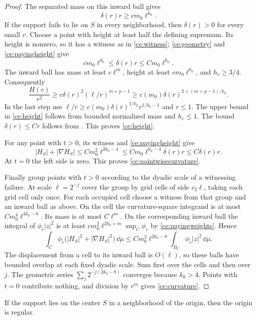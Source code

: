 \begin{proof}


The separated mass on this inward ball gives
\begin{equation}
 \label{ce:payingheight}
 \delta(r)r\ge c m_0\ell^{k_0}.
\end{equation}
If the support fails to lie on $S$ in every neighborhood, then
$\delta(r)>0$ for every small $r$.  Choose a point with height at
least half the defining supremum.  Its height is nonzero, so it
has a witness as in \eqref{ce:witness}; \eqref{ce:geometry} and
\eqref{ce:payingheight} give
\[
 c m_0\ell^{k_0}\le\delta(r)r
                         \le C m_0\ell^{k_0}.
\]
The inward ball has mass at least $c\ell^m$, height at least
$cm_0\ell^{k_0}$, and $h_r\ge3/4$.  Consequently
\[
 \frac{H(r)}{r^2}
 \ge c\delta(r)^2(\ell/r)^{m+p-1}
 \ge c(m_0)\delta(r)^{2+(m+p-1)/k_0}.
\]
In the last step use
$\ell/r\ge c(m_0)\delta(r)^{1/k_0}r^{1/k_0-1}$ and $r\le1$.
The upper bound in \eqref{ce:height} follows from bounded normalized
mass and $h_r\le1$.  The bound $\delta(r)\le Cr$ follows from
.  This proves \eqref{ce:height}.

For any point with $t>0$, its witness and
\eqref{ce:payingheight} give
\[
 |H_S|+|\nabla H_S|
 \le Cm_0^2\ell^{2k_0-4}
 \le Cm_0\ell^{k_0-4}\delta(r)r
 \le C\delta(r)r.
\]
At $t=0$ the left side is zero.  This proves
\eqref{ce:pointwisecurvature}.

Finally group points with $t>0$ according to the dyadic scale of
a witnessing failure.  At scale $\ell=2^{-j}$ cover the group by
grid cells of side $c_2\ell$, taking each grid cell only once.
For each occupied cell choose a witness from that group and an
inward ball as above.  On the cell the curvature-square integrand
is at most $Cm_0^4\ell^{4k_0-8}$.  Its mass is at most
$C\ell^m$.  On the corresponding inward ball the integral of
$\phi_r|z|^2$ is at least
$c m_0^2\ell^{2k_0+m}\sup_C\phi_r$ by
\eqref{ce:payingweights}.  Hence
\[
 \int_C\phi_r\bigl(|H_S|^2+|\nabla H_S|^2\bigr)\,\dd\mu
 \le Cm_0^2\ell^{2k_0-8}
                  \int_{B_C}\phi_r|z|^2\,\dd\mu.
\]
The displacement from a cell to its inward ball is $O(\ell)$,
so these balls have bounded overlap at each fixed dyadic scale.
Sum first over the cells and then over $j$.  The geometric series
$\sum_j2^{-j(2k_0-8)}$ converges because $k_0>4$.  Points with
$t=0$ contribute nothing, and division by $r^m$ gives
\eqref{ce:curvature}.
\end{proof}

\begin{corollary}\label{ce:constancy}
If the support lies on the center $S$ in a neighborhood of the origin,
then the origin is regular.
\end{corollary}

